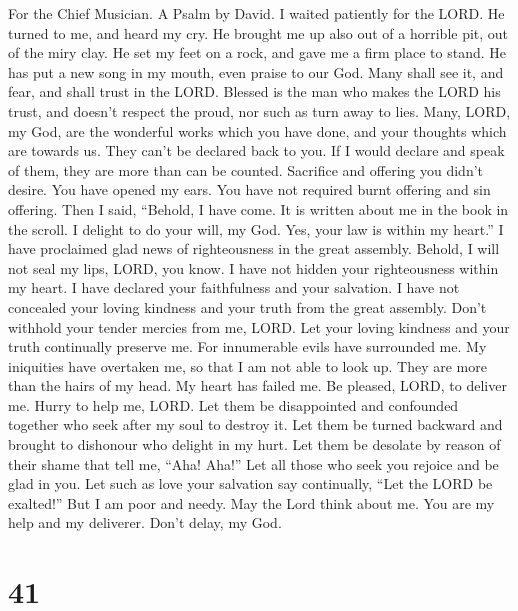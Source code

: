 For the Chief Musician. A Psalm by David.  I waited
patiently for the LORD. He turned to me, and heard my cry. 
He brought me up also out of a horrible pit, out of the miry clay. He
set my feet on a rock, and gave me a firm place to stand. 
He has put a new song in my mouth, even praise to our God. Many shall
see it, and fear, and shall trust in the LORD.  Blessed is
the man who makes the LORD his trust, and doesn't respect the proud, nor
such as turn away to lies.  Many, LORD, my God, are the
wonderful works which you have done, and your thoughts which are towards
us. They can't be declared back to you. If I would declare and speak of
them, they are more than can be counted.  Sacrifice and
offering you didn't desire. You have opened my ears. You have not
required burnt offering and sin offering.  Then I said,
``Behold, I have come. It is written about me in the book in the scroll.
 I delight to do your will, my God. Yes, your law is within
my heart.''  I have proclaimed glad news of righteousness in
the great assembly. Behold, I will not seal my lips, LORD, you know.
 I have not hidden your righteousness within my heart. I
have declared your faithfulness and your salvation. I have not concealed
your loving kindness and your truth from the great assembly.
 Don't withhold your tender mercies from me, LORD. Let your
loving kindness and your truth continually preserve me. 
For innumerable evils have surrounded me. My iniquities have overtaken
me, so that I am not able to look up. They are more than the hairs of my
head. My heart has failed me.  Be pleased, LORD, to deliver
me. Hurry to help me, LORD.  Let them be disappointed and
confounded together who seek after my soul to destroy it. Let them be
turned backward and brought to dishonour who delight in my hurt.
 Let them be desolate by reason of their shame that tell
me, ``Aha! Aha!''  Let all those who seek you rejoice and
be glad in you. Let such as love your salvation say continually, ``Let
the LORD be exalted!''  But I am poor and needy. May the
Lord think about me. You are my help and my deliverer. Don't delay, my
God.

\hypertarget{section-40}{%
\section{41}\label{section-40}}

